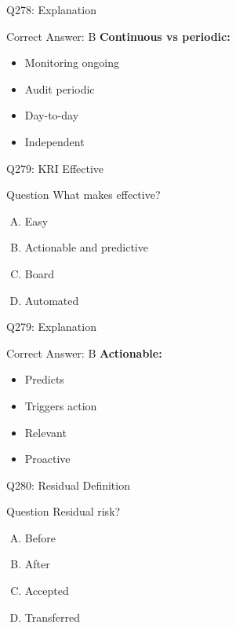 \documentclass{beamer}
\begin{document}
	\begin{frame}{Q278: Explanation}
		\begin{block}{Correct Answer: B}
			\textbf{Continuous vs periodic:}
			\begin{itemize}
				\item Monitoring ongoing
				\item Audit periodic
				\item Day-to-day
				\item Independent
			\end{itemize}
		\end{block}
	\end{frame}
	
	\begin{frame}{Q279: KRI Effective}
		\begin{block}{Question}
			What makes effective?
		\end{block}
		\begin{enumerate}[(A)]
			\item Easy
			\item Actionable and predictive
			\item Board
			\item Automated
		\end{enumerate}
	\end{frame}
	
	\begin{frame}{Q279: Explanation}
		\begin{block}{Correct Answer: B}
			\textbf{Actionable:}
			\begin{itemize}
				\item Predicts
				\item Triggers action
				\item Relevant
				\item Proactive
			\end{itemize}
		\end{block}
	\end{frame}
	
	\begin{frame}{Q280: Residual Definition}
		\begin{block}{Question}
			Residual risk?
		\end{block}
		\begin{enumerate}[(A)]
			\item Before
			\item After
			\item Accepted
			\item Transferred
		\end{enumerate}
	\end{frame}
	
\end{document}
